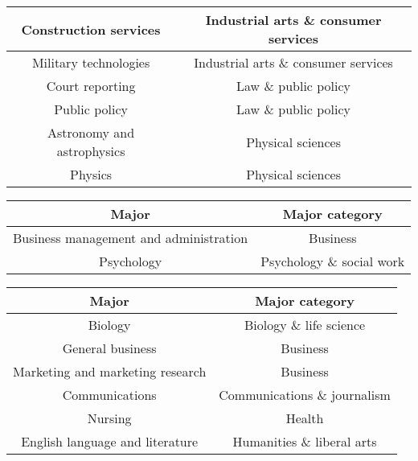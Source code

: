 \documentclass[11pt]{article}
\begin{document}
\begin{center}
\begin{tabular} {|| c c ||}
    \hline
    Construction services & Industrial arts \& consumer services \\
    \hline
    Military technologies & Industrial arts \& consumer services \\
    \hline
    Court reporting & Law \& public policy \\
    \hline
    Public policy & Law \& public policy \\
    \hline
    Astronomy and astrophysics & Physical sciences \\
    \hline
    Physics & Physical sciences \\
    \hline
\end {tabular}
\label{table:three}
\end{center}

\begin{center}
    \begin{tabular} {|| c c ||}
    \hline
    Major & Major category \\ [0.5ex]
    \hline\hline
    Business management and administration & Business \\
    \hline
    Psychology & Psychology \& social work \\
    \hline
    \end {tabular}
\end{center}

\begin{center}
    \begin{tabular} {|| c c ||}
    \hline
    Major & Major category \\ [0.5ex]
    \hline\hline
    Biology & Biology \& life science \\
    \hline
    General business & Business \\
    \hline
    Marketing and marketing research & Business \\
    \hline
    Communications & Communications \& journalism \\
    \hline
    Nursing & Health \\
    \hline
    English language and literature & Humanities \& liberal arts \\
    \hline
    \end {tabular}
\end{center}
\end{document}
